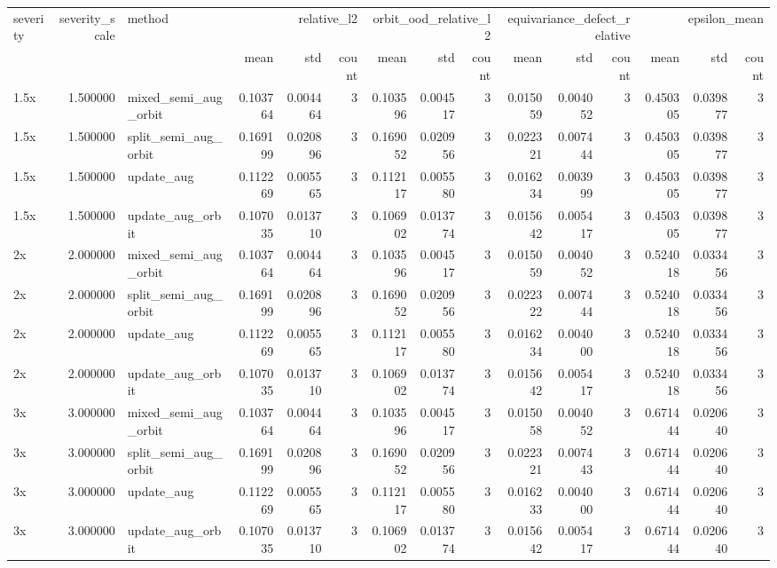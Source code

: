 \begin{tabular}{lrlrrrrrrrrrrrr}
\toprule
severity & severity_scale & method & \multicolumn{3}{r}{relative_l2} & \multicolumn{3}{r}{orbit_ood_relative_l2} & \multicolumn{3}{r}{equivariance_defect_relative} & \multicolumn{3}{r}{epsilon_mean} \\
 &  &  & mean & std & count & mean & std & count & mean & std & count & mean & std & count \\
\midrule
1.5x & 1.500000 & mixed_semi_aug_orbit & 0.103764 & 0.004464 & 3 & 0.103596 & 0.004517 & 3 & 0.015059 & 0.004052 & 3 & 0.450305 & 0.039877 & 3 \\
1.5x & 1.500000 & split_semi_aug_orbit & 0.169199 & 0.020896 & 3 & 0.169052 & 0.020956 & 3 & 0.022321 & 0.007444 & 3 & 0.450305 & 0.039877 & 3 \\
1.5x & 1.500000 & update_aug & 0.112269 & 0.005565 & 3 & 0.112117 & 0.005580 & 3 & 0.016234 & 0.003999 & 3 & 0.450305 & 0.039877 & 3 \\
1.5x & 1.500000 & update_aug_orbit & 0.107035 & 0.013710 & 3 & 0.106902 & 0.013774 & 3 & 0.015642 & 0.005417 & 3 & 0.450305 & 0.039877 & 3 \\
2x & 2.000000 & mixed_semi_aug_orbit & 0.103764 & 0.004464 & 3 & 0.103596 & 0.004517 & 3 & 0.015059 & 0.004052 & 3 & 0.524018 & 0.033456 & 3 \\
2x & 2.000000 & split_semi_aug_orbit & 0.169199 & 0.020896 & 3 & 0.169052 & 0.020956 & 3 & 0.022322 & 0.007444 & 3 & 0.524018 & 0.033456 & 3 \\
2x & 2.000000 & update_aug & 0.112269 & 0.005565 & 3 & 0.112117 & 0.005580 & 3 & 0.016234 & 0.004000 & 3 & 0.524018 & 0.033456 & 3 \\
2x & 2.000000 & update_aug_orbit & 0.107035 & 0.013710 & 3 & 0.106902 & 0.013774 & 3 & 0.015642 & 0.005417 & 3 & 0.524018 & 0.033456 & 3 \\
3x & 3.000000 & mixed_semi_aug_orbit & 0.103764 & 0.004464 & 3 & 0.103596 & 0.004517 & 3 & 0.015058 & 0.004052 & 3 & 0.671444 & 0.020640 & 3 \\
3x & 3.000000 & split_semi_aug_orbit & 0.169199 & 0.020896 & 3 & 0.169052 & 0.020956 & 3 & 0.022321 & 0.007443 & 3 & 0.671444 & 0.020640 & 3 \\
3x & 3.000000 & update_aug & 0.112269 & 0.005565 & 3 & 0.112117 & 0.005580 & 3 & 0.016233 & 0.004000 & 3 & 0.671444 & 0.020640 & 3 \\
3x & 3.000000 & update_aug_orbit & 0.107035 & 0.013710 & 3 & 0.106902 & 0.013774 & 3 & 0.015642 & 0.005417 & 3 & 0.671444 & 0.020640 & 3 \\

\end{tabular}
